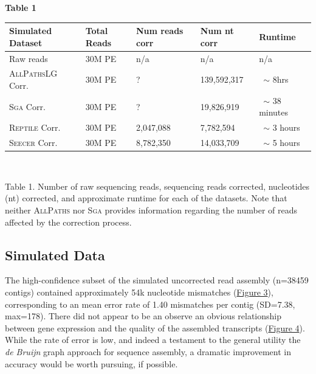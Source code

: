 \documentclass[11pt]{article}
\begin{document}
\noindent
\textbf{\hypertarget{Table 1}{Table 1}} \\
\begin{center}
    \begin{tabular}{ | l | l | l  | l | l |}
    \hline
    Simulated Dataset &  Total Reads & Num reads corr & Num  nt corr & Runtime  \\ \hline
    Raw reads & 30M PE & n/a & n/a & n/a \\ \hline
    \textsc{AllPathsLG} Corr. & 30M PE & ? & 139,592,317 & \ $\sim$ 8hrs \\ \hline
    \textsc{Sga} Corr. & 30M PE & ? & 19,826,919 & \ $\sim$ 38 minutes \\ \hline
    \textsc{Reptile} Corr. & 30M PE & 2,047,088 & 7,782,594 & \ $\sim$ 3 hours \\ \hline
     \textsc{Seecer} Corr. & 30M PE & 8,782,350 & 14,033,709 & \ $\sim$ 5 hours \\ \hline
       \end{tabular}
\\
\end{center}
\noindent
\begin{changemargin}{2cm}{2cm}
Table 1. Number of raw sequencing reads, sequencing reads corrected, nucleotides (nt) corrected, and approximate runtime for each of the datasets. Note that neither \textsc{AllPaths} nor \textsc{Sga} provides information regarding the number of reads affected by the correction process. 
\end{changemargin}

\subsection*{Simulated Data}
The high-confidence subset of the simulated uncorrected read assembly (n=38459 contigs) contained approximately 54k nucleotide mismatches (\hyperlink{Figure 3}{Figure 3}), corresponding to an mean error rate of 1.40 mismatches per contig (SD=7.38, max=178).  There did not appear to be an observe an obvious relationship between gene expression and the quality of the assembled transcripts (\hyperlink{Figure 4}{Figure 4}). While the rate of error is low, and indeed a testament to the general utility the \textit{de Bruijn} graph approach for sequence assembly, a dramatic improvement in accuracy would be worth pursuing, if possible.  \\
\end{document}
